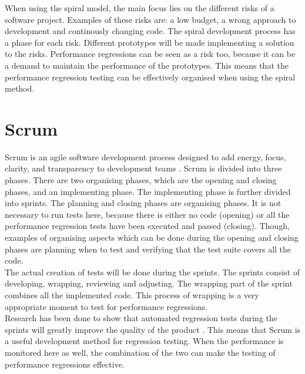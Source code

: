 When using the spiral model, the main focus lies on the different risks of a software project. Examples of these risks are: a low budget, a wrong approach to development and continously changing code. The spiral development process has a phase for each risk. Different prototypes will be made implementing a solution to the risks. Performance regressions can be seen as a risk too, because it can be a demand to maintain the performance of the prototypes. This means that the performance regression testing can be effectively organised when using the spiral method.

\section{Scrum}
Scrum is an agile software development process designed to add energy, focus, clarity, and transparency to development teams \cite{sutherland2007distributed}. Scrum is divided into three phases. There are two organising phases, which are the opening and closing phases, and an implementing phase. The implementing phase is further divided into sprints. The planning and closing phases are organising phases. It is not necessary to run tests here, because there is either no code (opening) or all the performance regression tests have been executed and passed (closing). Though, examples of organising aspects which can be done during the opening and closing phases are planning when to test and verifying that the test suite covers all the code. \\ The actual creation of tests will be done during the sprints. The sprints consist of developing, wrapping, reviewing and adjusting. The wrapping part of the sprint combines all the implemented code. This process of wrapping is a very appropriate moment to test for performance regressions. \\ Research has been done to show that automated regression tests during the sprints will greatly improve the quality of the product \cite{Future_of_Scrum}. This means that Scrum is a useful development method for regression testing. When the performance is monitored here as well, the combination of the two can make the testing of performance regressions effective.  \\ 

